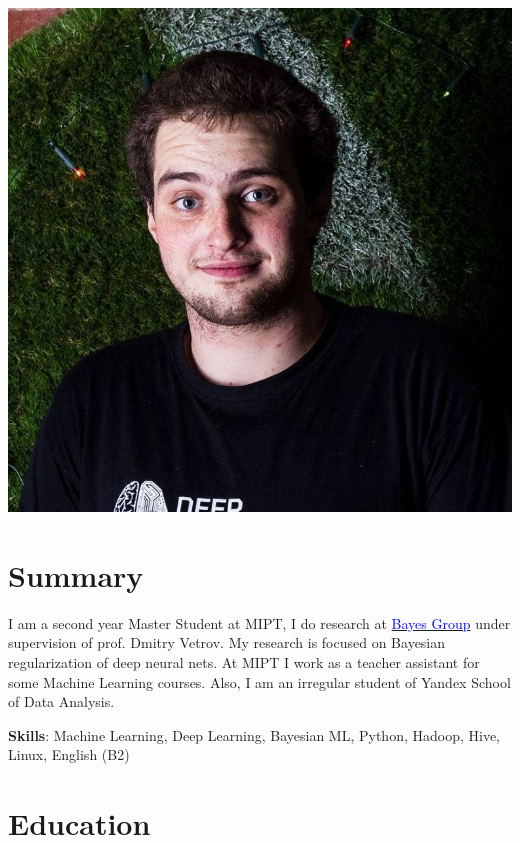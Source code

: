 \documentclass[a4paper,10pt]{article} %
\begin{document}
\begin{multicols}{2}
\includegraphics[scale=0.13]{img/avatar_rect2}

\section{Summary}
 \vspace{-0.2cm}
 
I am a second year Master Student at MIPT, I do research at \href{bayesgroup.ru}{\textcolor{blue}{Bayes Group}} under supervision of prof. Dmitry Vetrov. My research is focused on Bayesian regularization of deep neural nets. At MIPT I work as a teacher assistant for some Machine Learning courses. Also, I am an irregular student of Yandex School of Data Analysis.
 

\textbf{Skills}: Machine Learning, Deep Learning, Bayesian ML, Python, Hadoop, Hive, Linux, English (B2)

\end{multicols}


\section{Education}
\end{document}

